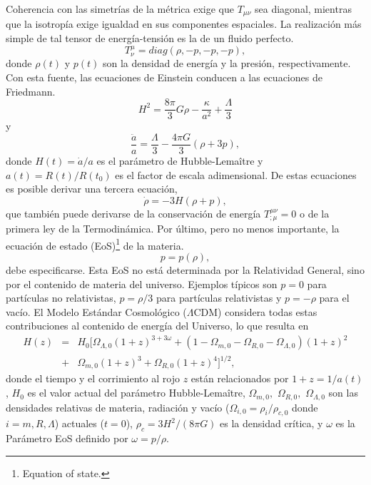 Coherencia con las simetrías de la métrica exige que $T_{\mu \nu}$ sea diagonal, mientras que la isotropía exige igualdad en sus componentes espaciales. La realización más simple de tal tensor de energía-tensión es la de un fluido perfecto.
\begin{equation}
T^\mu_\nu = diag(\rho, -p, -p, -p),
\end{equation}
donde $\rho(t)$ y $p(t)$ son la densidad de energía y la presión, respectivamente. Con esta fuente, las ecuaciones de Einstein conducen a las ecuaciones de Friedmann.
\begin{equation}
H^2 = \frac{8 \pi}{3} G \rho - \frac{\kappa}{a^2} + \frac{\Lambda}{3}
\label{Friedmann1}
\end{equation}
y
\begin{equation}
\frac{\ddot{a}}{a} =  \frac{\Lambda}{3} - \frac{4 \pi G}{3} (\rho + 3 p),
\label{Friedmann2}
\end{equation}
donde $H(t)=\dot{a}/a$ es el parámetro de Hubble-Lema\^itre y $a(t)=R(t)/R(t_0)$ es el factor de escala adimensional. De estas ecuaciones es posible derivar una tercera ecuación,
\begin{equation}
\dot{\rho} = - 3 H (\rho + p),
\label{Friedmann3}
\end{equation}
que también puede derivarse de la conservación de energía $T^{\mu \nu}_{;\mu}=0$ o de la primera ley de la Termodinámica. Por último, pero no menos importante, la ecuación de estado (EoS)\footnote{Equation of state.} de la materia.
\begin{equation}
p = p(\rho),
\label{EoS}
\end{equation}
debe especificarse. Esta EoS no está determinada por la Relatividad General, sino por el contenido de materia del universo. Ejemplos típicos son $p=0$ para partículas no relativistas, $p=\rho /3$ para partículas relativistas y $p=-\rho$ para el vacío. El Modelo Estándar Cosmológico ($\Lambda$CDM) considera todas estas contribuciones al contenido de energía del Universo, lo que resulta en
\begin{eqnarray}
H(z) & = & H_0 \bigg[   \Omega_{\Lambda,0} (1+z)^{3+3\omega} +  (1-\Omega_{m,0} - \Omega_{R,0} - \Omega_{\Lambda,0} )(1+z)^2  \nonumber \\ 
& + & \Omega_{m,0} (1+z)^3  + \Omega_{R,0} (1+z)^4 \bigg]^{1/2}, 
\end{eqnarray}
donde el tiempo y el corrimiento al rojo $z$ están relacionados por $1+z = 1/a(t)$, $H_0$ es el valor actual del parámetro Hubble-Lema\^itre, $\Omega_{m,0},$ $ \Omega_{R,0},$ $\Omega_{\Lambda,0}$ son las densidades relativas de materia, radiación y vacío ($\Omega_{i,0} = \rho_i / \rho_{c,0}$ donde $i=m,R,\Lambda$) actuales ($t = 0$), $\rho_c = 3H^2/(8\pi G)$ es la densidad crítica, y $\omega$ es la Parámetro EoS definido por $\omega = p/\rho$.


